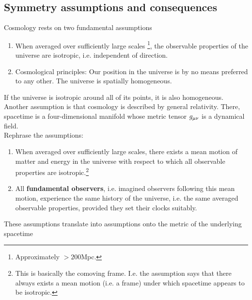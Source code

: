 \subsection{Symmetry assumptions and consequences}
Cosmology rests on two fundamental assumptions
\begin{enumerate}
	\item When averaged over sufficiently large scales \footnote{Approximately $>200$Mpc.}, the observable properties of the universe are isotropic, i.e. independent of direction.
	\item Cosmological principles: Our position in the universe is by no means preferred to any other. The universe is spatially homogeneous.
\end{enumerate}
If the universe is isotropic around all of its points, it is also homogeneous.\\
Another assumption is that cosmology is described by general relativity. There, spacetime is a four-dimensional manifold whose metric tensor $g_{\mu \nu}$ is a dynamical field.\\
Rephrase the assumptions:
\begin{enumerate}
	\item 	When averaged over sufficiently large scales, there exists a mean motion of matter and energy in the universe with respect to which all observable properties are isotropic.\footnote{This is basically the comoving frame. I.e. the assumption says that there always exists a mean motion (i.e. a frame) under which spacetime appears to be isotropic.}
	\item All \textbf{fundamental observers}, i.e. imagined observers following this mean motion, experience the same history of the universe, i.e. the same averaged observable properties, provided they set their clocks suitably.	
\end{enumerate}
These assumptions translate into assumptions onto the metric of the underlying spacetime

